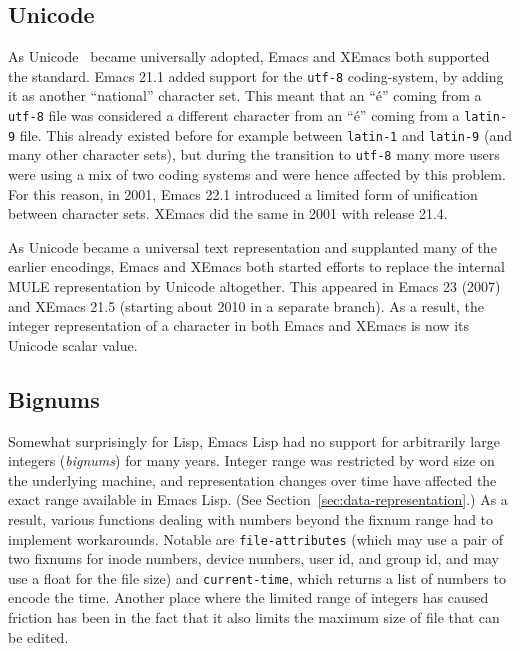 \documentclass[format=acmsmall, review]{acmart}
\newcommand \Elisp {Emacs Lisp}
\begin{document}
\subsection{Unicode}

As Unicode~\cite{Unicode6} became universally adopted, Emacs and XEmacs both
supported the standard.  Emacs 21.1 added support for the \texttt{utf-8}
coding-system, by adding it as another ``national'' character set.
This meant that an ``é'' coming from a \texttt{utf-8} file was considered a different
character from an ``é'' coming from a \texttt{latin-9} file.  This already
existed before for example between \texttt{latin-1} and \texttt{latin-9} (and many other
character sets), but during the transition to \texttt{utf-8} many more users were
using a mix of two coding systems and were hence affected by this problem.
For this reason, in 2001, Emacs 22.1 introduced a limited form of
unification between character sets.  XEmacs did the same in 2001 with
release 21.4.

As Unicode became a universal text representation and supplanted many
of the earlier encodings, Emacs and XEmacs both started efforts to
replace the internal MULE representation by Unicode altogether.  This
appeared in Emacs 23 (2007) and XEmacs 21.5 (starting about 2010 in a
separate branch).  As a result, the integer representation of a
character in both Emacs and XEmacs is now its Unicode scalar value.


\subsection{Bignums}

Somewhat surprisingly for Lisp, \Elisp{} had no support for
arbitrarily large integers (\emph{bignums}) for many years.
Integer range was restricted by word size on the underlying machine,
and representation changes over time have affected the exact range
available in \Elisp.  (See Section~\ref{sec:data-representation}.)
As a result, various functions dealing with numbers beyond the fixnum range
had to implement workarounds.  Notable are \texttt{file-attributes} (which
may use a pair of two fixnums for inode numbers, device numbers, user id,
and group id, and may use a float for the file size) and
\texttt{current-time}, which returns a list of numbers to encode the time.
Another place where the limited range of integers has caused friction has
been in the fact that it also limits the maximum size of file that can
be edited.
\end{document}
